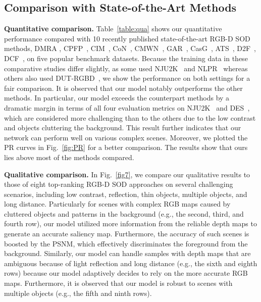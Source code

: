 \documentclass[runningheads]{llncs}
\begin{document}
	\subsection{Comparison with State-of-the-Art Methods}
	\textbf{Quantitative comparison.} Table~\ref{table:qua} shows our quantitative performance compared with 10 recently published state-of-the-art RGB-D SOD methods, DMRA \cite{piao2019depth}, CPFP~\cite{zhao2019contrast}, CIM~\cite{zhang2020select}, CoN~\cite{ji2020accurate}, CMWN~\cite{li2020cross}, GAR~\cite{chen2020progressively}, CasG~\cite{luo2020cascade}, ATS~\cite{zhang2020asymmetric}, D2F~\cite{sun2021deep}, DCF~\cite{ji2021calibrated}, on five popular benchmark datasets. Because the training data in these comparative studies differ slightly, as some used NJU2K~\cite{ju2014depth} and NLPR~\cite{peng2014rgbd} whereas others also used DUT-RGBD~\cite{piao2019depth}, we show the performance on both settings for a fair comparison. It is observed that our model notably outperforms the other methods. In particular, our model exceeds the counterpart methods by a dramatic margin in terms of all four evaluation metrics on NJU2K~\cite{ju2014depth} and DES~\cite{cheng2014depth}, which are considered more challenging than to the others due to the low contrast and objects cluttering the background. This result further indicates that our network can perform well on various complex scenes. Moreover, we plotted the PR curves in Fig.~\ref{fig:PR} for a better comparison. The results show that ours lies above most of the methods compared.
	
	\noindent \textbf{Qualitative comparison.} In Fig.~\ref{fig7}, we compare our qualitative results to those of eight top-ranking RGB-D SOD approaches on several challenging scenarios, including low contrast, reflection, thin objects, multiple objects, and long distance. Particularly for scenes with complex RGB maps caused by cluttered objects and patterns in the background (e.g., the second, third, and fourth row), our model utilized more information from the reliable depth maps to generate an accurate saliency map. Furthermore, the accuracy of such scenes is boosted by the PSNM, which effectively discriminates the foreground from the background. Similarly, our model can handle samples with depth maps that are ambiguous because of light reflection and long distance (e.g., the sixth and eighth rows) because our model adaptively decides to rely on the more accurate RGB maps. Furthermore, it is observed that our model is robust to scenes with multiple objects (e.g., the fifth and ninth rows).
	
\end{document}
